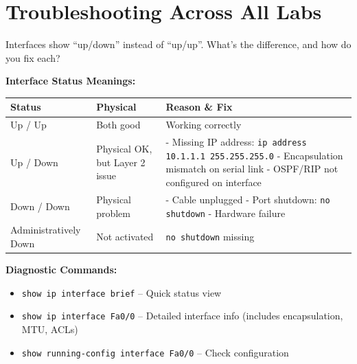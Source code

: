 \documentclass[12pt,a4paper]{article}
\begin{document}
\section{Troubleshooting Across All Labs}

\begin{qbox}{Interfaces show ``up/down'' instead of ``up/up''. What's the difference, and how do you fix each?}
\end{qbox}

\begin{abox}
\textbf{Interface Status Meanings:}

\begin{center}
\begin{tabularx}{\textwidth}{lXX}
\toprule
\textbf{Status} & \textbf{Physical} & \textbf{Reason \& Fix} \\
\midrule
Up / Up & Both good & Working correctly \\

Up / Down & Physical OK, but Layer 2 issue & \begin{minipage}[t]{\linewidth}
- Missing IP address: \texttt{ip address 10.1.1.1 255.255.255.0}
- Encapsulation mismatch on serial link
- OSPF/RIP not configured on interface
\end{minipage} \\

Down / Down & Physical problem & \begin{minipage}[t]{\linewidth}
- Cable unplugged
- Port shutdown: \texttt{no shutdown}
- Hardware failure
\end{minipage} \\

Administratively Down & Not activated & \texttt{no shutdown} missing \\
\bottomrule
\end{tabularx}
\end{center}

\textbf{Diagnostic Commands:}
\begin{itemize}
    \item \texttt{show ip interface brief} -- Quick status view
    \item \texttt{show ip interface Fa0/0} -- Detailed interface info (includes encapsulation, MTU, ACLs)
    \item \texttt{show running-config interface Fa0/0} -- Check configuration
\end{itemize}
\end{abox}
\end{document}
